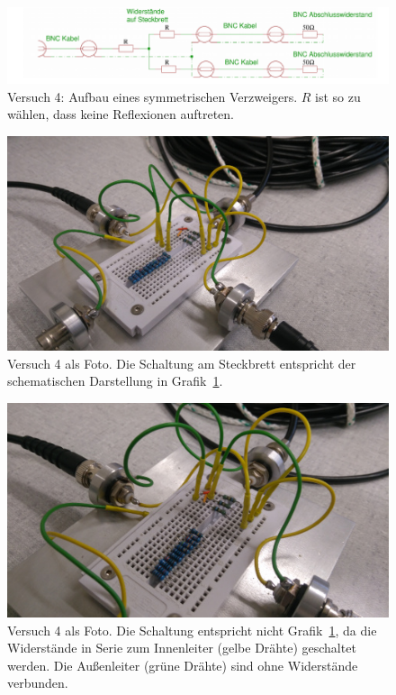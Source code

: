 \documentclass{article}
\begin{document}
\begin{figure}[H]
\centering
\caption{Versuch 4: Aufbau eines symmetrischen Verzweigers. $R$ ist so zu wählen, dass keine Reflexionen auftreten.}
\label{fig:anordnung_task4}
\includegraphics[scale=2]{task4.png}
\end{figure}



\begin{figure}[H]
\centering
\caption{Versuch 4 als Foto. Die Schaltung am Steckbrett entspricht der schematischen Darstellung in Grafik~\ref{fig:anordnung_task4}.}
\label{fig:foto_task4_richtig}
\includegraphics[scale=0.6]{task4_richtig.jpg}
\end{figure}

\begin{figure}[H]
\centering
\caption{Versuch 4 als Foto. Die Schaltung entspricht nicht Grafik~\ref{fig:anordnung_task4}, da die Widerstände in Serie zum Innenleiter (gelbe Drähte) geschaltet werden. Die Außenleiter (grüne Drähte) sind ohne Widerstände verbunden.}
\label{fig:foto_task4_falsch}
\includegraphics[scale=0.6]{task4_falsch.jpg}
\end{figure}
\end{document}
